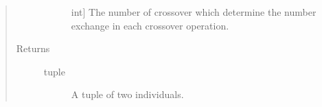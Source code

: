 \documentclass[letterpaper,10pt,english]{sphinxmanual}
\begin{document}
\begin{fulllineitems}
\begin{quote}
\begin{description}
\begin{description}
\begin{itemize}
\end{itemize}

\item[{\sphinxstylestrong{cross\_num}}] \leavevmode{[}int{]}
\sphinxAtStartPar
The number of crossover which determine the number exchange in each
crossover operation.

\end{description}

\item[{Returns}] \leavevmode\begin{description}
\item[{tuple}] \leavevmode
\sphinxAtStartPar
A tuple of two individuals.

\end{description}

\end{description}\end{quote}

\end{fulllineitems}

\end{document}
